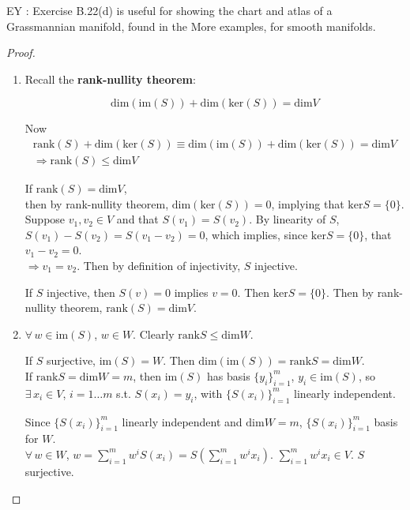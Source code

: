 EY : Exercise B.22(d) is useful for showing the chart and atlas of a Grassmannian manifold, found in the More examples, for smooth manifolds.  

\begin{proof}
\begin{enumerate}
\item[(a)] Recall the \textbf{rank-nullity theorem}:  
\begin{theorem} 
	\begin{equation}
	\text{dim}(\text{im}(S)) + \text{dim}(\text{ker}(S)) = \text{dim}V  
	\end{equation}			
\end{theorem} 
Now
\[
\begin{gathered}
\text{rank}(S) + \text{dim}(\text{ker}(S)) \equiv \text{dim}(\text{im}(S)) + \text{dim}(\text{ker}(S)) = \text{dim}V  \\
\Longrightarrow \boxed{ 	\text{rank}(S) \leq \text{dim}V  }
\end{gathered}
\]

If $\text{rank}(S) = \text{dim}{V}$, \\
then by rank-nullity theorem, $\text{dim}(\text{ker}(S)) = 0$, implying that $\text{ker}S = \lbrace 0 \rbrace$.  \\
Suppose $v_1, v_2 \in V$ and that $S(v_1) = S(v_2) $.  By linearity of $S$, $S(v_1) - S(v_2) = S(v_1-v_2) = 0$, which implies, since $\text{ker}S = \lbrace 0 \rbrace$, that $v_1 - v_2 = 0$.  \\
$\Longrightarrow v_1 = v_2$.  Then by definition of injectivity, $S$ injective.  

If $S$ injective, then $S(v)=0$ implies $v=0$.  Then $\text{ker}S = \lbrace 0 \rbrace$.  Then by rank-nullity theorem, $\text{rank}(S) = \text{dim}{V}$.  

\item[(b)] 		$\forall \, w \in \text{im}(S)$, $w\in W$.  Clearly $\text{rank}S \leq \text{dim}W$.  

If $S$ surjective, $\text{im}(S) = W$.  Then $\text{dim}(\text{im}(S)) = \text{rank}S = \text{dim}W$.  \\

If $\text{rank}S = \text{dim}W = m$, then $\text{im}(S)$ has basis $\lbrace y_i \rbrace_{i=1}^m$, $y_i \in \text{im}(S)$, so $\exists \, x_i \in V$, $i=1\dots m$ s.t. $S(x_i) = y_i$, with $\lbrace S(x_i) \rbrace_{i=1}^m $ linearly independent.  

Since $\lbrace S(x_i) \rbrace_{i=1}^m$ linearly independent and $\text{dim}W = m$, $\lbrace S(x_i) \rbrace_{i=1}^m$ basis for $W$.   \\
$\forall \, w \in W$, $w=\sum_{i=1}^m w^i S(x_i) = S(\sum_{i=1}^m w^i x_i)$.  $\sum_{i=1}^m w^i x_i \in V$.  $S$ surjective.  


\end{enumerate}
\end{proof}
